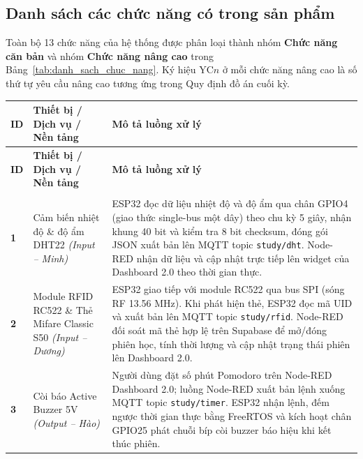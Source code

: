 \subsection{Danh sách các chức năng có trong sản phẩm}

Toàn bộ 13 chức năng của hệ thống được phân loại thành nhóm \textbf{Chức năng căn bản} và nhóm \textbf{Chức năng nâng cao} trong Bảng~\ref{tab:danh_sach_chuc_nang}. Ký hiệu YC$n$ ở mỗi chức năng nâng cao là số thứ tự yêu cầu nâng cao tương ứng trong Quy định đồ án cuối kỳ.

\newpage
\begingroup
\setlength{\tabcolsep}{4pt}
\renewcommand{\arraystretch}{1.08}
\begin{longtable}{|>{\centering\arraybackslash}p{0.8cm}|>{\raggedright\arraybackslash}p{4.5cm}|>{\raggedright\arraybackslash}p{11.3cm}|}
\hline
\textbf{ID} & \textbf{Thiết bị / Dịch vụ / Nền tảng} & \textbf{Mô tả luồng xử lý} \\ \hline
\endfirsthead
\hline
\textbf{ID} & \textbf{Thiết bị / Dịch vụ / Nền tảng} & \textbf{Mô tả luồng xử lý} \\ \hline
\endhead
\hline
\multicolumn{3}{|c|}{\textbf{Thông tin chức năng căn bản (Yêu cầu căn bản -- mỗi sinh viên phụ trách 1 luồng)}} \\ \hline
\textbf{1} & Cảm biến nhiệt độ \& độ ẩm DHT22 \newline \textit{(Input -- Minh)} & ESP32 đọc dữ liệu nhiệt độ và độ ẩm qua chân GPIO4 (giao thức single-bus một dây) theo chu kỳ 5 giây, nhận khung 40 bit và kiểm tra 8 bit checksum, đóng gói JSON xuất bản lên MQTT topic \texttt{study/dht}. Node-RED nhận dữ liệu và cập nhật trực tiếp lên widget của Dashboard 2.0 theo thời gian thực. \\ \hline

\textbf{2} & Module RFID RC522 \& Thẻ Mifare Classic S50 \newline \textit{(Input -- Dương)} & ESP32 giao tiếp với module RC522 qua bus SPI (sóng RF 13.56 MHz). Khi phát hiện thẻ, ESP32 đọc mã UID và xuất bản lên MQTT topic \texttt{study/rfid}. Node-RED đối soát mã thẻ hợp lệ trên Supabase để mở/đóng phiên học, tính thời lượng và cập nhật trạng thái phiên lên Dashboard 2.0. \\ \hline

\textbf{3} & Còi báo Active Buzzer 5V \newline \textit{(Output -- Hào)} & Người dùng đặt số phút Pomodoro trên Node-RED Dashboard 2.0; luồng Node-RED xuất bản lệnh xuống MQTT topic \texttt{study/timer}. ESP32 nhận lệnh, đếm ngược thời gian thực bằng FreeRTOS và kích hoạt chân GPIO25 phát chuỗi bíp còi buzzer báo hiệu khi kết thúc phiên. \\ \hline


\end{longtable}
